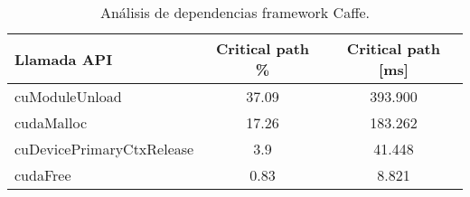 \begin{table}[]

\centering
 \caption{Análisis de dependencias framework Caffe.}
\begin{tabular}{lcc}
\toprule
Llamada API               & Critical path \% & Critical path {[}ms{]} \\
\midrule
cuModuleUnload            & 37.09            & 393.900             \\
cudaMalloc                & 17.26            & 183.262\\
cuDevicePrimaryCtxRelease & 3.9              & 41.448              \\
cudaFree                  & 0.83             & 8.821
\\
\bottomrule
\end{tabular}
\label{api-caffe}
\end{table}